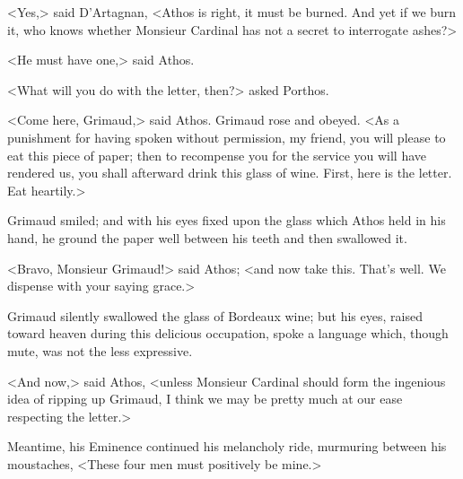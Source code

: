 <Yes,> said D'Artagnan, <Athos is right, it must be burned. And yet if we burn it, who knows whether Monsieur Cardinal has not a secret to interrogate ashes?> 

<He must have one,> said Athos. 

<What will you do with the letter, then?> asked Porthos. 

<Come here, Grimaud,> said Athos. Grimaud rose and obeyed. <As a punishment for having spoken without permission, my friend, you will please to eat this piece of paper; then to recompense you for the service you will have rendered us, you shall afterward drink this glass of wine. First, here is the letter. Eat heartily.> 

Grimaud smiled; and with his eyes fixed upon the glass which Athos held in his hand, he ground the paper well between his teeth and then swallowed it. 

<Bravo, Monsieur Grimaud!> said Athos; <and now take this. That's well. We dispense with your saying grace.> 

Grimaud silently swallowed the glass of Bordeaux wine; but his eyes, raised toward heaven during this delicious occupation, spoke a language which, though mute, was not the less expressive. 

<And now,> said Athos, <unless Monsieur Cardinal should form the ingenious idea of ripping up Grimaud, I think we may be pretty much at our ease respecting the letter.> 

Meantime, his Eminence continued his melancholy ride, murmuring between his moustaches, <These four men must positively be mine.> 
